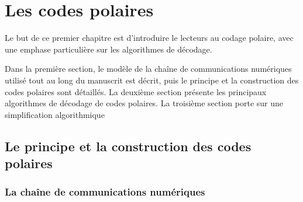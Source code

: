 
\chapter{Les codes polaires}
\label{chap:polar_codes}

Le but de ce premier chapitre est d'introduire le lecteurs au codage polaire, avec une emphase particulière sur les algorithmes de décodage.

Dans la première section, le modèle de la chaîne de communications numériques utilisé tout au long du manuscrit est décrit, puis le principe et la construction des codes polaires sont détaillés. La deuxième section présente les principaux algorithmes de décodage de codes polaires. La troisième section porte sur une simplification algorithmique 




\vspace*{\fill}
\minitocTITI
\vspace*{\fill}

\section{Le principe et la construction des codes polaires}

\subsection{La chaîne de communications numériques}
\label{subsec:contexte}


